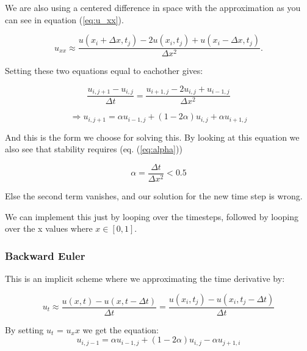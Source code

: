 \documentclass[a4paper,10pt]{article}
\begin{document}
We are also using a centered difference in space with the approximation as you can see in equation (\ref{eq:u_xx}). 

\begin{equation}
u_{xx}\approx \frac{u(x_i+\Delta x,t_j)-2u(x_i,t_j)+u(x_i-\Delta x,t_j)}{\Delta x^2}.
\label{eq:u_xx}
\end{equation}

Setting these two equations equal to eachother gives:
 
\begin{equation}
\frac{u_{i,j+1} - u_{i,j}}{\Delta t} = \frac{u_{i+1,j} - 2u_{i,j} + u_{i-1,j}}{\Delta x^2} 
\end{equation}

\begin{equation}
 \Rightarrow u_{i,j+1} = \alpha u_{i-1,j} + (1 -2\alpha)u_{i,j} + \alpha u_{i+1,j}
 \label{eq:Forward_eulerScheme}
\end{equation}

And this is the form we choose for solving this. By looking at this equation we also see that stability requires (eq. (\ref{eq:alpha}))

\begin{equation}
\alpha = \frac{\Delta t}{\Delta x^2} < 0.5
\label{eq:alpha}
\end{equation}

Else the second term vanishes, and our solution for the new time step is wrong.

We can implement this just by looping over the timesteps, followed by looping over the 
x values where $x \in [0,1]$.

\subsubsection{Backward Euler}

This is an implicit scheme where we approximating the time derivative by:

\begin{equation}
u_t\approx \frac{u(x,t)-u(x,t-\Delta t)}{\Delta t}=\frac{u(x_i,t_j)-u(x_i,t_j-\Delta t)}{\Delta t}
\label{eq:bacward_Euler}
\end{equation}

By setting $u_t$ = $u_xx$ we get the equation:
\begin{equation}
u_{i,j-1} = \alpha u_{i-1,j} + (1-2\alpha)u_{i,j} - \alpha u_{j+1,i}
\label{eq:Backward_eulerScheme}
\end{equation}
\end{document}

